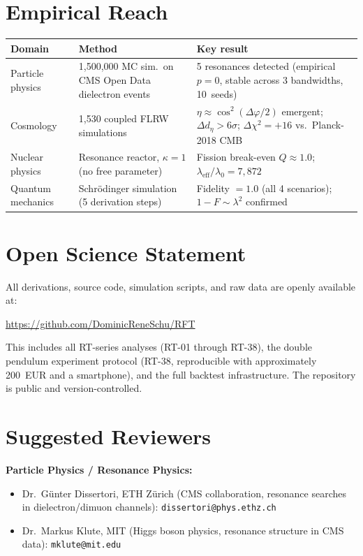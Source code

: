 \documentclass[12pt]{article}
\begin{document}
\section*{Empirical Reach}

\begin{table}[h!]
\centering
\begin{tabular}{p{3cm} p{5cm} p{5.5cm}}
\toprule
Domain & Method & Key result \\
\midrule
Particle physics & 1,500,000 MC sim.\ on CMS Open Data dielectron events &
  5 resonances detected (empirical $p = 0$, stable across 3 bandwidths, 10~seeds) \\
Cosmology & 1,530 coupled FLRW simulations &
  $\eta \approx \cos^2(\Delta\varphi/2)$ emergent; $\Delta d_\eta > 6\sigma$;
  $\Delta\chi^2 = +16$ vs.\ Planck-2018 CMB \\
Nuclear physics & Resonance reactor, $\kappa = 1$ (no free parameter) &
  Fission break-even $Q \approx 1.0$; $\lambda_{\mathrm{eff}}/\lambda_0 = 7{,}872$ \\
Quantum mechanics & Schr\"odinger simulation (5 derivation steps) &
  Fidelity $= 1.0$ (all 4 scenarios); $1-F \sim \lambda^2$ confirmed \\
\bottomrule
\end{tabular}
\end{table}

\section*{Open Science Statement}

All derivations, source code, simulation scripts, and raw data are openly available at:
\begin{center}
\url{https://github.com/DominicReneSchu/RFT}
\end{center}
\noindent This includes all RT-series analyses (RT-01 through RT-38), the double pendulum
experiment protocol (RT-38, reproducible with approximately 200~EUR and a smartphone),
and the full backtest infrastructure. The repository is public and version-controlled.

\section*{Suggested Reviewers}

\noindent\textbf{Particle Physics / Resonance Physics:}

\begin{itemize}
\item Dr.\ G\"unter Dissertori, ETH Z\"urich (CMS collaboration, resonance searches in
  dielectron/dimuon channels): \texttt{dissertori@phys.ethz.ch}
\item Dr.\ Markus Klute, MIT (Higgs boson physics, resonance structure in CMS data):
  \texttt{mklute@mit.edu}
\end{itemize}
\end{document}
